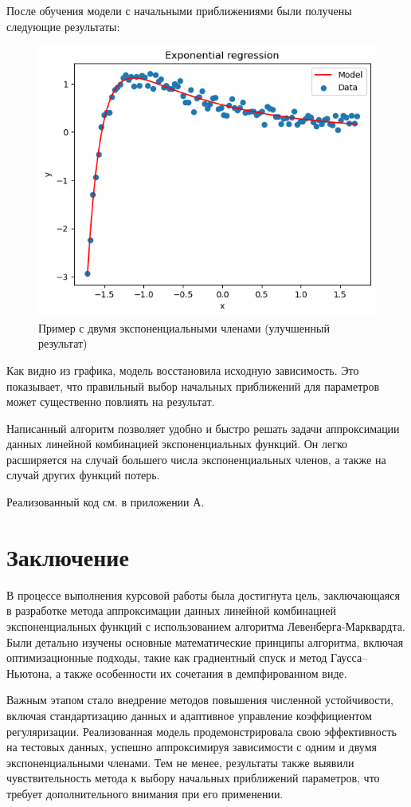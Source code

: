 После обучения модели с начальными приближениями были получены следующие результаты:

\begin{figure}[h!]
	\centering
	\includegraphics[width=0.7\linewidth]{../img/ex2_good.png}
	\caption{Пример с двумя экспоненциальными членами (улучшенный результат)}
\end{figure}


Как видно из графика, модель восстановила исходную зависимость. Это показывает, что правильный выбор начальных приближений для параметров может существенно повлиять на результат.

Написанный алгоритм позволяет удобно и быстро решать задачи аппроксимации данных линейной комбинацией экспоненциальных функций. Он легко расширяется на случай большего числа экспоненциальных членов, а также на случай других функций потерь.

Реализованный код см. в приложении А.

\newpage
\section*{Заключение}

В процессе выполнения курсовой работы была достигнута цель, заключающаяся в разработке метода аппроксимации данных линейной комбинацией экспоненциальных функций с использованием алгоритма Левенберга-Марквардта. Были детально изучены основные математические принципы алгоритма, включая оптимизационные подходы, такие как градиентный спуск и метод Гаусса–Ньютона, а также особенности их сочетания в демпфированном виде.

Важным этапом стало внедрение методов повышения численной устойчивости, включая стандартизацию данных и адаптивное управление коэффициентом регуляризации. Реализованная модель продемонстрировала свою эффективность на тестовых данных, успешно аппроксимируя зависимости с одним и двумя экспоненциальными членами. Тем не менее, результаты также выявили чувствительность метода к выбору начальных приближений параметров, что требует дополнительного внимания при его применении.

